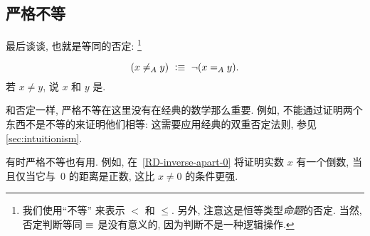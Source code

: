 \subsection{严格不等}
\label{sec:disequality}

最后谈谈,
%
也就是等同的否定:
\footnote{我们使用``不等''%
来表示 $<$ 和 $\leq$. 另外, 注意这是恒等类型\emph{命题}的否定.
当然,否定判断等同 $\jdeq$ 是没有意义的, 因为判断不是一种逻辑操作.} %

\begin{equation*}
(x \neq_A y)
    \ \defeq\ \lnot (\id[A]{x}{y}).
\end{equation*}
若 $x\neq y$, 说 $x$ 和 $y$ 是.%

和否定一样, 严格不等在这里没有在经典的数学那么重要.
例如, 不能通过证明两个东西不是不等的来证明他们相等: 这需要应用经典的双重否定法则, 参见 \cref{sec:intuitionism}.

有时严格不等也有用.
例如, 在~\cref{RD-inverse-apart-0} 将证明实数 $x$ 有一个倒数, 当且仅当它与~$0$ 的距离是正数, 这比 $x \neq 0$ 的条件更强.

%